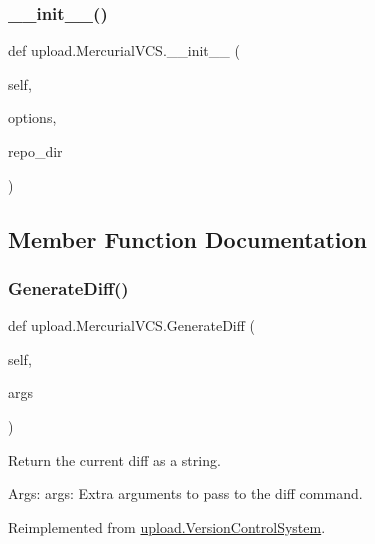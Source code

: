 \subsubsection{\texorpdfstring{\_\_init\_\_()}{\_\_init\_\_()}\hspace{0.1cm}{\footnotesize\ttfamily [2/2]}}
{\footnotesize\ttfamily def upload.\+Mercurial\+V\+C\+S.\+\_\+\+\_\+init\+\_\+\+\_\+ (\begin{DoxyParamCaption}\item[{}]{self,  }\item[{}]{options,  }\item[{}]{repo\+\_\+dir }\end{DoxyParamCaption})}



\subsection{Member Function Documentation}
\mbox{\label{classupload_1_1MercurialVCS_a6c05746012d8cd435c94ace1465671ef}} 
\subsubsection{\texorpdfstring{GenerateDiff()}{GenerateDiff()}\hspace{0.1cm}{\footnotesize\ttfamily [1/2]}}
{\footnotesize\ttfamily def upload.\+Mercurial\+V\+C\+S.\+Generate\+Diff (\begin{DoxyParamCaption}\item[{}]{self,  }\item[{}]{args }\end{DoxyParamCaption})}

\begin{DoxyVerb}Return the current diff as a string.

Args:
  args: Extra arguments to pass to the diff command.
\end{DoxyVerb}
 

Reimplemented from \mbox{\hyperlink{classupload_1_1VersionControlSystem_aa5eb260c96e7016dab36b5fc136c9f49}{upload.\+Version\+Control\+System}}.

\mbox{\label{classupload_1_1MercurialVCS_a6c05746012d8cd435c94ace1465671ef}} 
